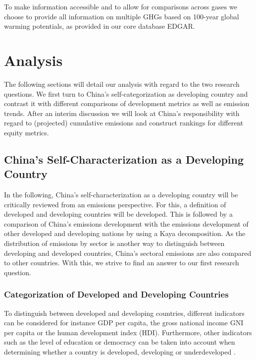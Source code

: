 \documentclass[
  12pt,
]{article}
\numberwithin{equation}{section}
\numberwithin{table}{section}
\numberwithin{figure}{section}
\begin{document}
To make information accessible and to allow for comparisons across gases
we choose to provide all information on multiple GHGs based on 100-year
global warming potentials, as provided in our core database EDGAR.

\hypertarget{analysis}{%
\section{Analysis}\label{analysis}}

The following sections will detail our analysis with regard to the two
research questions. We first turn to China's self-categorization as
developing country and contrast it with different comparisons of
development metrics as well as emission trends. After an interim
discussion we will look at China's responsibility with regard to
(projected) cumulative emissions and construct rankings for different
equity metrics.

\hypertarget{chinas-self-characterization-as-a-developing-country}{%
\subsection{China's Self-Characterization as a Developing
Country}\label{chinas-self-characterization-as-a-developing-country}}

In the following, China's self-characterization as a developing country
will be critically reviewed from an emissions perspective. For this, a
definition of developed and developing countries will be developed. This
is followed by a comparison of China's emissions development with the
emissions development of other developed and developing nations by using
a Kaya decomposition. As the distribution of emissions by sector is
another way to distinguish between developing and developed countries,
China's sectoral emissions are also compared to other countries. With
this, we strive to find an answer to our first research question.

\hypertarget{categorization-of-developed-and-developing-countries}{%
\subsubsection{Categorization of Developed and Developing
Countries}\label{categorization-of-developed-and-developing-countries}}

To distinguish between developed and developing countries, different
indicators can be considered for instance GDP per capita, the gross
national income GNI per capita or the human development index (HDI).
Furthermore, other indicators such as the level of education or
democracy can be taken into account when determining whether a country
is developed, developing or underdeveloped \citep{Kinnunen2019}.
\end{document}
